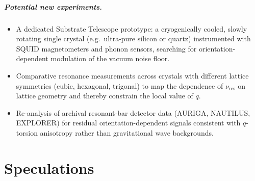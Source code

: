 \documentclass[12pt,a4paper]{report}
\begin{document}
\paragraph{Potential new experiments.}
\begin{itemize}
  \item A dedicated Substrate Telescope prototype: a cryogenically cooled,
        slowly rotating single crystal (e.g.\ ultra-pure silicon or quartz)
        instrumented with SQUID magnetometers and phonon sensors, searching
        for orientation-dependent modulation of the vacuum noise floor.
  \item Comparative resonance measurements across crystals with different
        lattice symmetries (cubic, hexagonal, trigonal) to map the
        dependence of $\nu_{\mathrm{res}}$ on lattice geometry and thereby
        constrain the local value of $q$.
  \item Re-analysis of archival resonant-bar detector data (AURIGA,
        NAUTILUS, EXPLORER) for residual orientation-dependent signals
        consistent with $q$-torsion anisotropy rather than gravitational
        wave backgrounds.
\end{itemize}
 \chapter{Speculations}
\label{chap:speculations}




\end{document}
